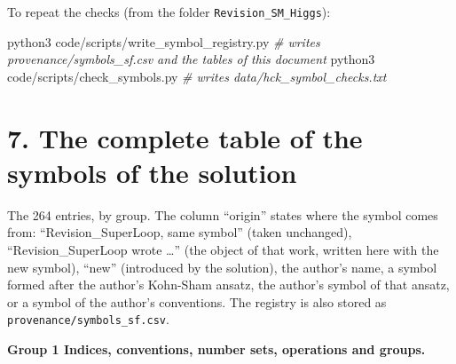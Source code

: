 \documentclass[
  10pt,
]{article}
\newenvironment{Shaded}{}{}
\newcommand{\CommentTok}[1]{\textcolor[rgb]{0.38,0.63,0.69}{\textit{#1}}}
\newcommand{\ExtensionTok}[1]{#1}
\newcommand{\NormalTok}[1]{#1}
\begin{document}
To repeat the checks (from the folder \texttt{Revision\_SM\_Higgs}):

\begin{Shaded}
\begin{Highlighting}[]
\ExtensionTok{python3}\NormalTok{ code/scripts/write\_symbol\_registry.py   }\CommentTok{\# writes provenance/symbols\_sf.csv and the tables of this document}
\ExtensionTok{python3}\NormalTok{ code/scripts/check\_symbols.py           }\CommentTok{\# writes data/hck\_symbol\_checks.txt}
\end{Highlighting}
\end{Shaded}

\hypertarget{the-complete-table-of-the-symbols-of-the-solution}{%
\section{7. The complete table of the symbols of the
solution}\label{the-complete-table-of-the-symbols-of-the-solution}}

The 264 entries, by group. The column ``origin'' states where the symbol
comes from: ``Revision\_SuperLoop, same symbol'' (taken unchanged),
``Revision\_SuperLoop wrote \ldots{}'' (the object of that work, written
here with the new symbol), ``new'' (introduced by the solution), the
author's name, a symbol formed after the author's Kohn-Sham ansatz, the
author's symbol of that ansatz, or a symbol of the author's conventions.
The registry is also stored as \texttt{provenance/symbols\_sf.csv}.

\textbf{Group 1 Indices, conventions, number sets, operations and
groups.}
\end{document}
